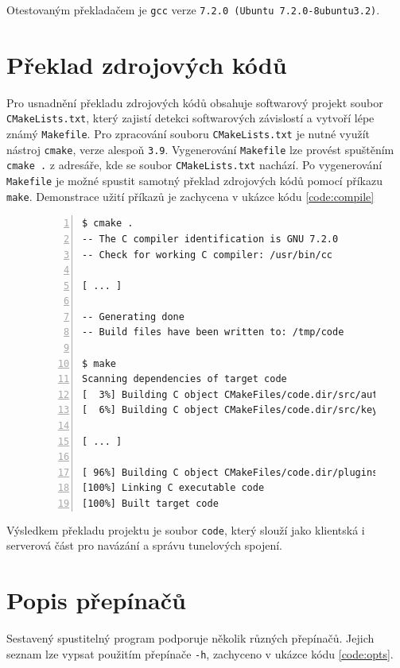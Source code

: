 \documentclass[thesis=M,czech]{FITthesis}[2012/10/20]
\begin{document}
Otestovaným překladačem je \texttt{gcc} verze \texttt{7.2.0 (Ubuntu 7.2.0-8ubuntu3.2)}.

\section{Překlad zdrojových kódů}

Pro usnadnění překladu zdrojových kódů obsahuje softwarový projekt soubor \texttt{CMakeLists.txt}, který zajistí detekci softwarových závislostí a vytvoří lépe známý \texttt{Makefile}. Pro zpracování souboru \texttt{CMakeLists.txt} je nutné využít nástroj \texttt{cmake}, verze alespoň \texttt{3.9}. Vygenerování \texttt{Makefile} lze provést spuštěním \texttt{cmake .} z adresáře, kde se soubor \texttt{CMakeLists.txt} nachází. Po vygenerování \texttt{Makefile} je možné spustit samotný překlad zdrojových kódů pomocí příkazu \texttt{make}. Demonstrace užití příkazů je zachycena v ukázce kódu \ref{code:compile}

\begin{figure}[h]
	\begin{lstlisting}[label=code:compile,caption=Ukázka překladu zdrojových kódů aplikace,frame=single,numbers=left, linewidth=1.1\textwidth]
$ cmake .
-- The C compiler identification is GNU 7.2.0
-- Check for working C compiler: /usr/bin/cc

[ ... ]

-- Generating done
-- Build files have been written to: /tmp/code

$ make
Scanning dependencies of target code
[  3%] Building C object CMakeFiles/code.dir/src/auth.c.o
[  6%] Building C object CMakeFiles/code.dir/src/keyfile.c.o

[ ... ]

[ 96%] Building C object CMakeFiles/code.dir/plugins/udp/udp.c.o
[100%] Linking C executable code
[100%] Built target code
      \end{lstlisting}
    \end{figure}

    Výsledkem překladu projektu je soubor \texttt{code}, který slouží jako klientská i serverová část pro navázání a správu tunelových spojení.
    
    \section{Popis přepínačů}
    
    Sestavený spustitelný program podporuje několik různých přepínačů. Jejich seznam lze vypsat použitím přepínače \texttt{-h}, zachyceno v ukázce kódu \ref{code:opts}.
    
\end{document}
